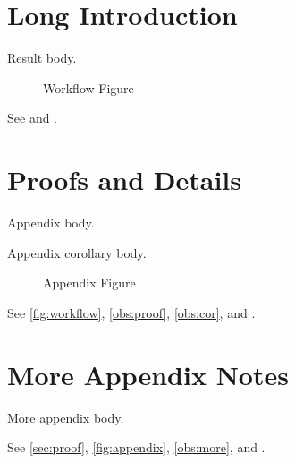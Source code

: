 \section[Short Intro]{Long Introduction}\label{sec:intro}
\begin{oblemma}\label{obs:main}
Result body.
\end{oblemma}
\begin{figure}\caption[Workflow Short]{Workflow Figure}\label{fig:workflow}\end{figure}
See  and .
\appendices
\section[Proof Notes]{Proofs and Details}\label{sec:proof}
\begin{oblemma}\label{obs:proof}
Appendix body.
\end{oblemma}
\begin{obcor}\label{obs:cor}
Appendix corollary body.
\end{obcor}
\begin{figure}\caption[Appendix Short]{Appendix Figure}\label{fig:appendix}\end{figure}
See \autoref{fig:workflow}, \cref{obs:proof}, \cref{obs:cor}, and .
\section[More Notes]{More Appendix Notes}\label{sec:more}
\begin{oblemma}\label{obs:more}
More appendix body.
\end{oblemma}
See \autoref{sec:proof}, \autoref{fig:appendix}, \cref{obs:more}, and .

